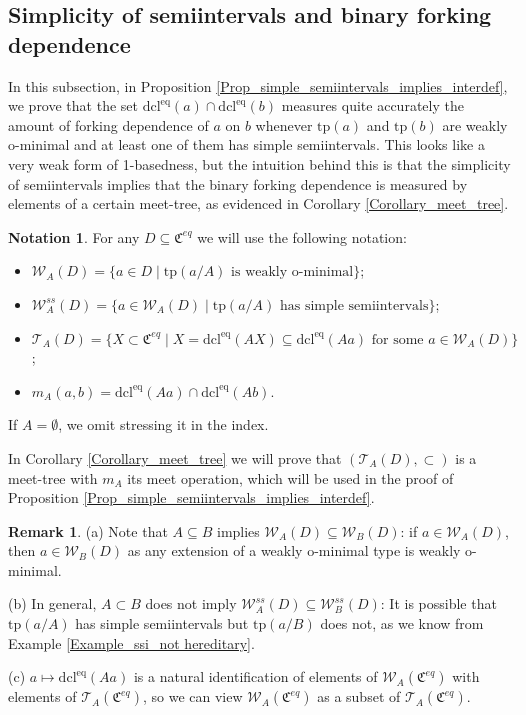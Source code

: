 \documentclass{amsart}
\theoremstyle{definition}
\theoremstyle{definition}
\newtheorem{Remark}[Theorem]{Remark}
\newtheorem{Notation}[Theorem]{Notation}
\newcommand{\Moneq}{\mathfrak C^{eq}}
\newcommand{\tp}{\mathrm{tp}}
\newcommand{\dcleq}{\mathrm{dcl^{eq}}}
\begin{document}
\subsection{Simplicity of semiintervals and binary forking dependence}
\label{Subsection 4}
 
In this subsection, in Proposition \ref{Prop_simple_semiintervals_implies_interdef}, we prove that the set $\dcleq(a)\cap \dcleq(b)$ measures quite accurately the amount of forking dependence of $a$ on $b$ whenever $\tp(a)$ and $\tp(b)$ are weakly o-minimal and at least one of them has simple semiintervals. This looks like a very weak form of 1-basedness, but the intuition behind this is that the simplicity of semiintervals implies that the binary forking dependence is measured by elements of a certain meet-tree, as evidenced in Corollary \ref{Corollary_meet_tree}. 


\begin{Notation} For any $D\subseteq \Moneq$ we will use the following notation:
\begin{itemize}
\item $\mathcal W_A(D)= \{a\in D\mid \mbox{$\tp(a/A)$ is weakly o-minimal}\}$;
\item $\mathcal W_A^{ss}(D)= \{a\in \mathcal W_A(D)\mid \mbox{$\tp(a/A)$ has simple semiintervals}\}$;
\item $\mathcal T_A(D)=\{X\subset \Moneq\mid \mbox{$X=\dcleq(AX)\subseteq \dcleq(Aa)$ for some $a\in \mathcal W_A(D)$}\}$;
\item $m_A(a,b)=\dcleq(Aa)\cap\dcleq(Ab)$. 
\end{itemize}
If $A=\emptyset$, we omit stressing it in the index.
\end{Notation}

In Corollary \ref{Corollary_meet_tree} we will prove that $(\mathcal T_A(D),\subset)$ is a meet-tree with $m_A$ its meet operation, which will be used in the proof of Proposition \ref{Prop_simple_semiintervals_implies_interdef}.  


\begin{Remark}\label{Remark increasing A in W_A and W_A^ss}
(a) Note that $A\subseteq B$ implies $\mathcal W_A(D)\subseteq\mathcal W_B(D)$: if $a\in\mathcal W_A(D)$, then $a\in\mathcal W_B(D)$ as any extension of a weakly o-minimal type is weakly o-minimal. 

(b) In general,  $A\subset B$ does not imply $\mathcal W_A^{ss}(D)\subseteq\mathcal W_B^{ss}(D)$: It is possible that $\tp(a/A)$ has simple semiintervals but $\tp(a/B)$ does not, as we know from Example \ref{Example_ssi_not hereditary}.

(c) $a\mapsto \dcleq(Aa)$ is a natural identification of elements of $\mathcal W_A(\Moneq)$ with elements of $\mathcal T_A(\Moneq)$, so we can view $\mathcal W_A(\Moneq)$ as a subset of $\mathcal T_A(\Moneq)$.
\end{Remark}
\end{document}
